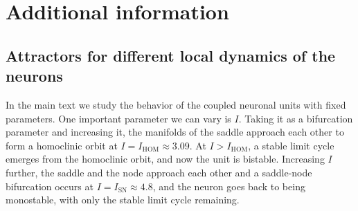 
\section*{Additional information}


\subsection*{Attractors for different local dynamics of the neurons}
In the main text we study the behavior of the coupled neuronal units with fixed parameters. One important parameter we can vary is $I$. Taking it as a bifurcation parameter and increasing it, the manifolds of the saddle approach each other to form a homoclinic orbit at $I = I_\mathrm{HOM} \approx 3.09$. At $I>I_\mathrm{HOM}$, a stable limit cycle emerges from the homoclinic orbit, and now the unit is bistable. Increasing $I$ further, the saddle and the node approach each other and a saddle-node bifurcation occurs at $I = I_\mathrm{SN} \approx 4.8$, and the neuron goes back to being monostable, with only the stable limit cycle remaining.



